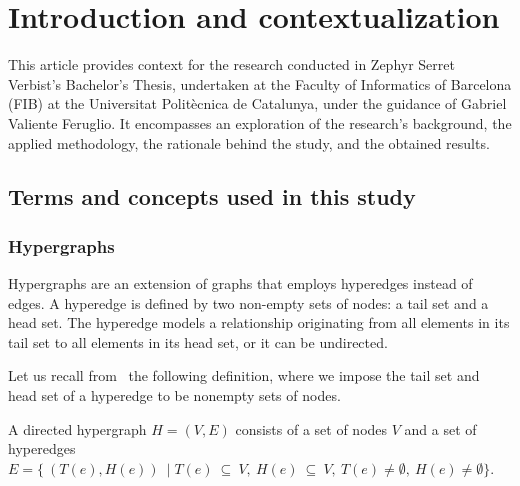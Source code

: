 

\section{Introduction and contextualization}\label{sec:context}
This article provides context for the research conducted in Zephyr Serret Verbist's Bachelor's Thesis, undertaken at the Faculty of Informatics of Barcelona (FIB) at the Universitat Politècnica de Catalunya, under the guidance of Gabriel Valiente Feruglio. It encompasses an exploration of the research's background, the applied methodology, the rationale behind the study, and the obtained results.

\subsection{Terms and concepts used in this study}

\subsubsection{Hypergraphs}

Hypergraphs are an extension of graphs that employs hyperedges instead of edges. A hyperedge is defined by two non-empty sets of nodes: a tail set and a head set. The hyperedge models a relationship originating from all elements in its tail set to all elements in its head set, or it can be undirected.

Let us recall from~\cite{Gallo.Longo.Pallottino.Nguyen:1993} the following definition, where we impose the tail set and head set of a hyperedge to be nonempty sets of nodes.

\begin{defn}
A directed hypergraph $H=(V,E)$ consists of a set of nodes $V$ and a set of hyperedges $E=\{\ (T(e),H(e))\ \mid T(e)\ \subseteq\ V,\ H(e)\ \subseteq\ V,\ T(e)\neq\emptyset,\ H(e)\neq\emptyset\}$.
\end{defn}


